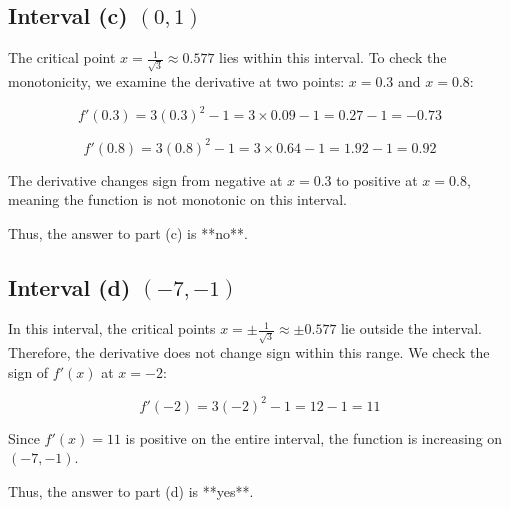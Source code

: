 \documentclass{article}
\begin{document}
\subsection{Interval (c) \( (0, 1) \)}

The critical point \( x = \frac{1}{\sqrt{3}} \approx 0.577 \) lies within this interval. To check the monotonicity, we examine the derivative at two points: \( x = 0.3 \) and \( x = 0.8 \):

\[
f'(0.3) = 3(0.3)^2 - 1 = 3 \times 0.09 - 1 = 0.27 - 1 = -0.73
\]

\[
f'(0.8) = 3(0.8)^2 - 1 = 3 \times 0.64 - 1 = 1.92 - 1 = 0.92
\]

The derivative changes sign from negative at \( x = 0.3 \) to positive at \( x = 0.8 \), meaning the function is not monotonic on this interval.

Thus, the answer to part (c) is **no**.

\subsection{Interval (d) \( (-7, -1) \)}

In this interval, the critical points \( x = \pm \frac{1}{\sqrt{3}} \approx \pm 0.577 \) lie outside the interval. Therefore, the derivative does not change sign within this range. We check the sign of \( f'(x) \) at \( x = -2 \):

\[
f'(-2) = 3(-2)^2 - 1 = 12 - 1 = 11
\]

Since \( f'(x) = 11 \) is positive on the entire interval, the function is increasing on \( (-7, -1) \).

Thus, the answer to part (d) is **yes**.
\end{document}
